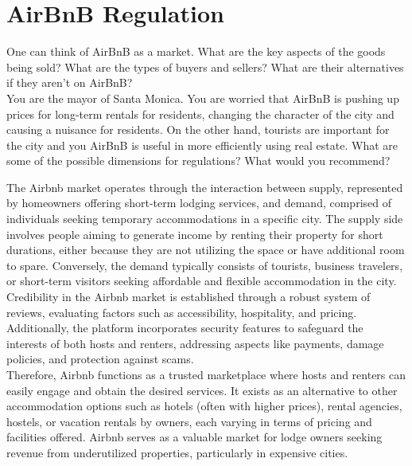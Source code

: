 \section{AirBnB Regulation}

\begin{tcolorbox}
    One can think of AirBnB as a market. What are the key aspects of the goods being sold? What
    are the types of buyers and sellers? What are their alternatives if they aren’t on AirBnB?\\

    You are the mayor of Santa Monica. You are worried that AirBnB is pushing up prices for long-term
    rentals for residents, changing the character of the city and causing a nuisance for residents. On the
    other hand, tourists are important for the city and you AirBnB is useful in more efficiently using real
    estate. What are some of the possible dimensions for regulations? What would you recommend?
\end{tcolorbox}

The Airbnb market operates through the interaction between supply, represented by homeowners offering short-term lodging services, and demand, comprised of individuals seeking temporary accommodations in a specific city. The supply side involves people aiming to generate income by renting their property for short durations, either because they are not utilizing the space or have additional room to spare. Conversely, the demand typically consists of tourists, business travelers, or short-term visitors seeking affordable and flexible accommodation in the city.\\

Credibility in the Airbnb market is established through a robust system of reviews, evaluating factors such as accessibility, hospitality, and pricing. Additionally, the platform incorporates security features to safeguard the interests of both hosts and renters, addressing aspects like payments, damage policies, and protection against scams.\\

Therefore, Airbnb functions as a trusted marketplace where hosts and renters can easily engage and obtain the desired services. It exists as an alternative to other accommodation options such as hotels (often with higher prices), rental agencies, hostels, or vacation rentals by owners, each varying in terms of pricing and facilities offered. Airbnb serves as a valuable market for lodge owners seeking revenue from underutilized properties, particularly in expensive cities.\\

